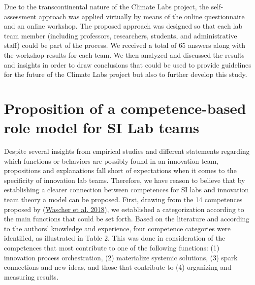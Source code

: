 \documentclass[AMA,STIX1COL,APA,STIX2COL]{WileyNJD-v2}
\begin{document}
Due to the transcontinental nature of the Climate Labs project, the
self-assessment approach was applied virtually by means of the online
questionnaire and an online workshop. The proposed approach was designed
so that each lab team member (including professors, researchers,
students, and administrative staff) could be part of the process. We
received a total of 65 answers along with the workshop results for each
team. We then analyzed and discussed the results and insights in order
to draw conclusions that could be used to provide guidelines for the
future of the Climate Labs project but also to further develop this
study.

\hypertarget{proposition-of-a-competence-based-role-model-for-si-lab-teams}{%
\section{Proposition of a competence-based role model for SI Lab
teams}\label{proposition-of-a-competence-based-role-model-for-si-lab-teams}}

Despite several insights from empirical studies and different statements
regarding which functions or behaviors are possibly found in an
innovation team, propositions and explanations fall short of
expectations when it comes to the specificity of innovation lab teams.
Therefore, we have reason to believe that by establishing a clearer
connection between competences for SI labs and innovation team theory a
model can be proposed. First, drawing from the 14 competences proposed
by (\protect\hyperlink{ref-Wascher2018}{Wascher et al. 2018}), we
established a categorization according to the main functions that could
be set forth. Based on the literature and according to the authors'
knowledge and experience, four competence categories were identified, as
illustrated in Table 2. This was done in consideration of the
competences that most contribute to one of the following functions: (1)
innovation process orchestration, (2) materialize systemic solutions,
(3) spark connections and new ideas, and those that contribute to (4)
organizing and measuring results.

\providecommand{\docline}[3]{\noalign{\global\setlength{\arrayrulewidth}{#1}}\arrayrulecolor[HTML]{#2}\cline{#3}}

\setlength{\tabcolsep}{2pt}

\renewcommand*{\arraystretch}{1.5}
\end{document}
